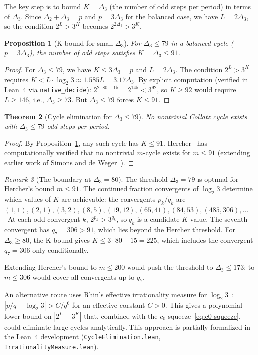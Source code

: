 \documentclass[manuscript]{aomart}
\theoremstyle{plain}
\newtheorem{theorem}{Theorem}[section]
\newtheorem{proposition}[theorem]{Proposition}
\theoremstyle{definition}
\theoremstyle{remark}
\newtheorem{remark}[theorem]{Remark}
\numberwithin{equation}{section}
\begin{document}
The key step is to bound $K = \Delta_3$ (the number of odd steps
per period) in terms of $\Delta_3$.  Since $\Delta_2 + \Delta_3 = p$
and $p = 3\Delta_3$ for the balanced case, we have $L = 2\Delta_3$,
so the condition $2^L > 3^K$ becomes $2^{2\Delta_3} > 3^K$.

\begin{proposition}[K-bound for small $\Delta_3$]
\label{prop:K-bound-small}
For $\Delta_3 \le 79$ in a balanced cycle ($p = 3\Delta_3$), the
number of odd steps satisfies $K = \Delta_3 \le 91$.
\end{proposition}

\begin{proof}
For $\Delta_3 \le 79$, we have $K \le 3\Delta_3 = p$ and
$L = 2\Delta_3$.  The condition $2^L > 3^K$ requires $K <
L \cdot \log_2 3 \approx 1.585 L = 3.17\Delta_3$.  By explicit
computation (verified in Lean~4 via \texttt{native\_decide}):
$2^{2 \cdot 80 - 15} = 2^{145} < 3^{92}$, so $K \ge 92$ would
require $L \ge 146$, i.e., $\Delta_3 \ge 73$.  But $\Delta_3 \le 79$
forces $K \le 91$.
\end{proof}

\begin{theorem}[Cycle elimination for $\Delta_3 \le 79$]
\label{thm:steiner-hercher}
No nontrivial Collatz cycle exists with $\Delta_3 \le 79$ odd
steps per period.
\end{theorem}

\begin{proof}
By Proposition~\ref{prop:K-bound-small}, any such cycle has
$K \le 91$.  Hercher~\cite{Hercher2024} has computationally verified
that no nontrivial $m$-cycle exists for $m \le 91$ (extending
earlier work of Simons and de Weger~\cite{SimonsDeWeger2005}).
\end{proof}

\begin{remark}[The boundary at $\Delta_3 = 80$]
\label{rem:boundary}
The threshold $\Delta_3 = 79$ is optimal for Hercher's bound
$m \le 91$.  The continued fraction convergents of $\log_2 3$
determine which values of $K$ are achievable: the convergents
$p_k/q_k$ are $(1,1), (2,1), (3,2), (8,5), (19,12), (65,41),
(84,53), (485,306), \ldots$\  At each odd convergent $k$,
$2^{p_k} > 3^{q_k}$, so $q_k$ is a candidate $K$-value.  The
seventh convergent has $q_7 = 306 > 91$, which lies beyond the
Hercher threshold.  For $\Delta_3 \ge 80$, the K-bound gives
$K \le 3 \cdot 80 - 15 = 225$, which includes the convergent
$q_7 = 306$ only conditionally.

Extending Hercher's bound to $m \le 200$ would push the threshold to
$\Delta_3 \le 173$; to $m \le 306$ would cover all convergents up
to $q_7$.

An alternative route uses Rhin's effective irrationality measure for
$\log_2 3$~\cite{Rhin1987}: $|p/q - \log_2 3| > C/q^6$ for an
effective constant $C > 0$.  This gives a polynomial lower bound on
$|2^L - 3^K|$ that, combined with the $c_0$
squeeze~\eqref{eq:c0-squeeze}, could eliminate large cycles
analytically.  This approach is partially formalized in the Lean~4
development (\texttt{CycleElimination.lean},
\texttt{IrrationalityMeasure.lean}).
\end{remark}
\end{document}
